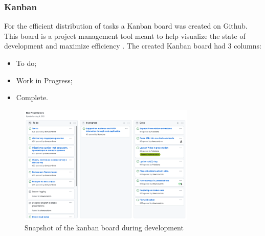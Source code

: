 \documentclass[12pt, fleqn, a4paper]{article}
\begin{document}
\subsubsection{Kanban}
For the efficient distribution of tasks a Kanban board was created on Github. This board is a project management tool meant to help visualize the state of development and maximize efficiency \citep{degrandis_demaria_2017}. The created Kanban board had 3 columns:
\begin{itemize}
	\item To do;
	\item Work in Progress;
	\item Complete.
\end{itemize}
\begin{figure}[H]
	\centering
	\includegraphics[width=0.75\textwidth]{img/kanban_board.png}
	\caption{Snapshot of the kanban board during development}
\end{figure}
\end{document}
